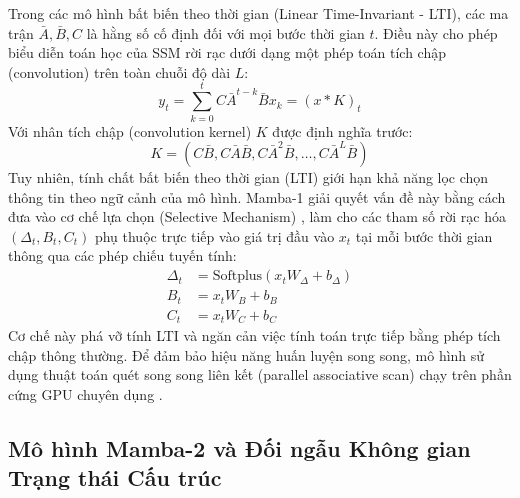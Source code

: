 Trong các mô hình bất biến theo thời gian (Linear Time-Invariant - LTI), các ma trận $\bar{A}, \bar{B}, C$ là hằng số cố định đối với mọi bước thời gian $t$. Điều này cho phép biểu diễn toán học của SSM rời rạc dưới dạng một phép toán tích chập (convolution) trên toàn chuỗi độ dài $L$:
\begin{equation}
    y_t = \sum_{k=0}^{t} C \bar{A}^{t-k} \bar{B} x_k = (x \ast K)_t
\end{equation}
Với nhân tích chập (convolution kernel) $K$ được định nghĩa trước:
\begin{equation}
    K = \left( C\bar{B}, C\bar{A}\bar{B}, C\bar{A}^2\bar{B}, \dots, C\bar{A}^L\bar{B} \right)
\end{equation}
Tuy nhiên, tính chất bất biến theo thời gian (LTI) giới hạn khả năng lọc chọn thông tin theo ngữ cảnh của mô hình. Mamba-1 giải quyết vấn đề này bằng cách đưa vào cơ chế lựa chọn (Selective Mechanism) \cite{gu2024mamba}, làm cho các tham số rời rạc hóa $(\Delta_t, B_t, C_t)$ phụ thuộc trực tiếp vào giá trị đầu vào $x_t$ tại mỗi bước thời gian thông qua các phép chiếu tuyến tính:
\begin{align}
    \Delta_t &= \text{Softplus}(x_t W_{\Delta} + b_{\Delta}) \\
    B_t      &= x_t W_B + b_B \\
    C_t      &= x_t W_C + b_C
\end{align}
Cơ chế này phá vỡ tính LTI và ngăn cản việc tính toán trực tiếp bằng phép tích chập thông thường. Để đảm bảo hiệu năng huấn luyện song song, mô hình sử dụng thuật toán quét song song liên kết (parallel associative scan) chạy trên phần cứng GPU chuyên dụng \cite{gu2024mamba}.

\subsection{Mô hình Mamba-2 và Đối ngẫu Không gian Trạng thái Cấu trúc}
\label{subsec:mamba2_ssd}

